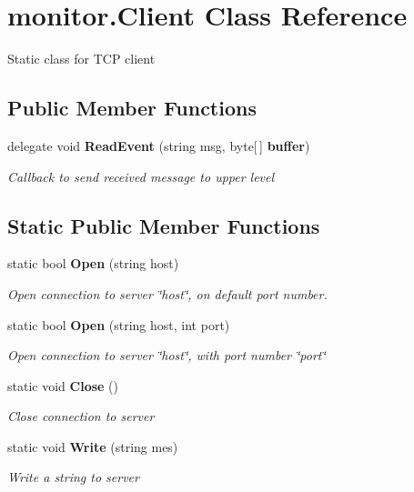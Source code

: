 \section{monitor.\+Client Class Reference}
\label{classmonitor_1_1_client}


Static class for T\+CP client  


\subsection*{Public Member Functions}
\begin{DoxyCompactItemize}
\item 
delegate void \textbf{ Read\+Event} (string msg, byte[$\,$] \textbf{ buffer})
\begin{DoxyCompactList}\small\item\em Callback to send received message to upper level \end{DoxyCompactList}\end{DoxyCompactItemize}
\subsection*{Static Public Member Functions}
\begin{DoxyCompactItemize}
\item 
static bool \textbf{ Open} (string host)
\begin{DoxyCompactList}\small\item\em Open connection to server \char`\"{}host\char`\"{}, on default port number. \end{DoxyCompactList}\item 
static bool \textbf{ Open} (string host, int port)
\begin{DoxyCompactList}\small\item\em Open connection to server \char`\"{}host\char`\"{}, with port number \char`\"{}port\char`\"{} \end{DoxyCompactList}\item 
static void \textbf{ Close} ()
\begin{DoxyCompactList}\small\item\em Close connection to server \end{DoxyCompactList}\item 
static void \textbf{ Write} (string mes)
\begin{DoxyCompactList}\small\item\em Write a string to server \end{DoxyCompactList}\end{DoxyCompactItemize}
